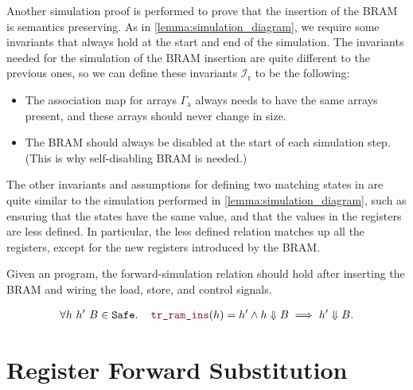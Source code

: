 Another simulation proof is performed to prove that the insertion of the
\gls{BRAM} is semantics preserving.  As in \cref{lemma:simulation_diagram}, we
require some invariants that always hold at the start and end of the simulation.
The invariants needed for the simulation of the \gls{BRAM} insertion are quite
different to the previous ones, so we can define these invariants
$\mathcal{I}_{\mathrm{r}}$ to be the following:

\begin{itemize}
\item The association map for arrays $\Gamma_{\mathrm{a}}$ always needs to have
  the same arrays present, and these arrays should never change in size.
\item The \gls{BRAM} should always be disabled at the start of each simulation
  step. (This is why self-disabling \gls{BRAM} is needed.)
\end{itemize}

The other invariants and assumptions for defining two matching states in \htl{}
are quite similar to the simulation performed in
\cref{lemma:simulation_diagram}, such as ensuring that the states have the same
value, and that the values in the registers are less defined.  In particular,
the less defined relation matches up all the registers, except for the new
registers introduced by the \gls{BRAM}.

\begin{lemma}\label{lemma:htl_ram}
  Given an \htl{} program, the forward-simulation relation should hold after
  inserting the \gls{BRAM} and wiring the load, store, and control signals.

  \begin{align*}
    \forall h\ h'\ B \in \texttt{Safe}\ldotp\quad \yhfunction{tr\_ram\_ins}(h) = h' \land h \Downarrow B \implies h' \Downarrow B.
  \end{align*}
\end{lemma}

\section{Register Forward Substitution}%
\label{sec:hg:register-forward-substitution}

